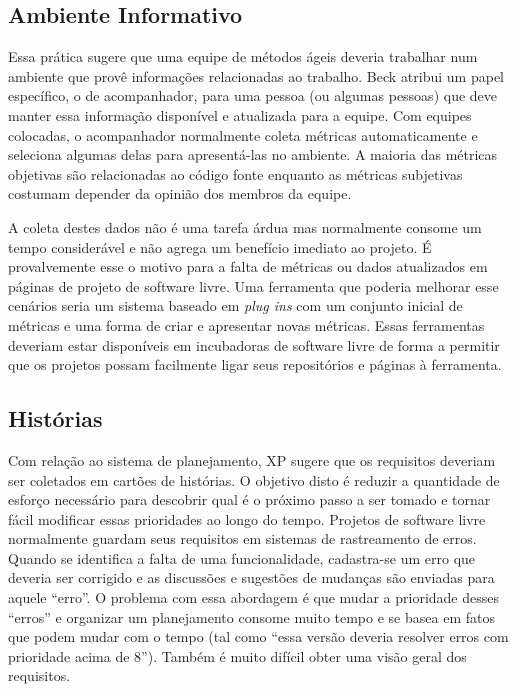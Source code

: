 \subsection{Ambiente Informativo}
\label{subsec:inform-worksp}

Essa prática sugere que uma equipe de métodos ágeis deveria trabalhar
num ambiente que provê informações relacionadas ao trabalho. Beck
\cite{XP01} atribui um papel específico, o de acompanhador, para uma
pessoa (ou algumas pessoas) que deve manter essa informação disponível
e atualizada para a equipe. Com equipes colocadas, o acompanhador
normalmente coleta métricas \cite{Sato2007} automaticamente e
seleciona algumas delas para apresentá-las no ambiente. A maioria das
métricas objetivas são relacionadas ao código fonte enquanto as
métricas subjetivas costumam depender da opinião dos membros da
equipe.

A coleta destes dados não é uma tarefa árdua mas normalmente consome
um tempo considerável e não agrega um benefício imediato ao projeto. É
provalvemente esse o motivo para a falta de métricas ou dados
atualizados em páginas de projeto de software livre. Uma ferramenta
que poderia melhorar esse cenários seria um sistema baseado em
\emph{plug ins} com um conjunto inicial de métricas e uma forma de
criar e apresentar novas métricas. Essas ferramentas deveriam estar
disponíveis em incubadoras de software livre de forma a permitir que
os projetos possam facilmente ligar seus repositórios e páginas à
ferramenta.

\subsection{Histórias}
\label{subsec:stories}

Com relação ao sistema de planejamento, XP sugere que os requisitos
deveriam ser coletados em cartões de histórias. O objetivo disto é
reduzir a quantidade de esforço necessário para descobrir qual é o
próximo passo a ser tomado e tornar fácil modificar essas prioridades
ao longo do tempo. Projetos de software livre normalmente guardam seus
requisitos em sistemas de rastreamento de erros. Quando se identifica
a falta de uma funcionalidade, cadastra-se um erro que deveria ser
corrigido e as discussões e sugestões de mudanças são enviadas para
aquele ``erro''. O problema com essa abordagem é que mudar a
prioridade desses ``erros'' e organizar um planejamento consome muito
tempo e se basea em fatos que podem mudar com o tempo (tal como ``essa
versão deveria resolver erros com prioridade acima de 8''). Também é
muito difícil obter uma visão geral dos requisitos.

